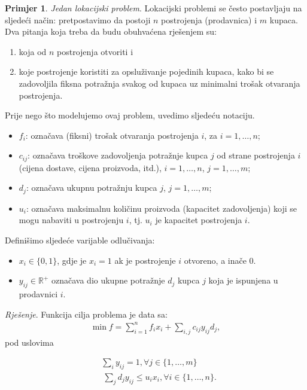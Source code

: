 \documentclass[a4paper, utf8, 11pt, colorlinks]{book}
\theoremstyle{definition}
\newtheorem{primjer}{Primjer}[chapter]
\begin{document}
\begin{primjer}
\emph{Jedan lokacijski problem}. Lokacijski problemi se često postavljaju na sljedeći način: pretpostavimo da postoji $n$ postrojenja (prodavnica)  i  $m$ kupaca. Dva pitanja koja treba da budu obuhvaćena rješenjem su:
\begin{enumerate}
	\item koja od $n$ postrojenja otvoriti i
	\item koje  postrojenje koristiti za opsluživanje pojedinih kupaca, kako bi se zadovoljila fiksna potražnja svakog od kupaca uz minimalni trošak otvaranja postrojenja.
\end{enumerate}
Prije nego što modelujemo ovaj problem, uvedimo sljedeću notaciju.
\begin{itemize}
	\item  $f_{i}$: označava (fiksni) trošak otvaranja postrojenja $i$, za  $ i = 1,  \ldots, n$;
	\item $c_{ij}$: označava troškove zadovoljenja potražnje  kupca $j$ od strane postrojenja $i$ (cijena dostave, cijena proizvoda,  itd.), $i = 1, \ldots, n$, $j = 1,  \ldots, m$;
	\item $d_{j}$: označava ukupnu potražnju kupca $j$, $j = 1, \ldots, m$;
	\item $u_{i}$: označava maksimalnu količinu proizvoda (kapacitet zadovoljenja) koji se mogu nabaviti u postrojenju $i$, tj. $u_{i}$ je kapacitet postrojenja $i$.
\end{itemize}
Definišimo sljedeće varijable odlučivanja:

\begin{itemize}
	\item $x_i \in \{0,1\}$, gdje je $x_i = 1$ ak je postrojenje $i$ otvoreno, a inače 0.
	\item $y_{ij} \in \mathbb{R}^+$  označava dio ukupne potražnje $d_j$ kupca $j$ koja je ispunjena u prodavnici $i$.  
\end{itemize}

\emph{Rješenje}. Funkcija cilja problema je data sa:
\begin{align}
 \min f = \sum_{i=1}^n f_i x_i  + \sum_{i,j} c_{ij} y_{ij} d_j, \label{const:location-objective}
 \end{align}
pod uslovima
 
\begin{align}
	  &\sum_{i} y_{ij} = 1, \forall j\in\{1,\ldots,m\}\label{const:location-1} \\
	  &~\sum_{j} d_j y_{ij} \leq u_i x_i, \forall i \in \{1,\ldots,n\}\label{const:location-2}.
\end{align}


\end{primjer}
\end{document}
